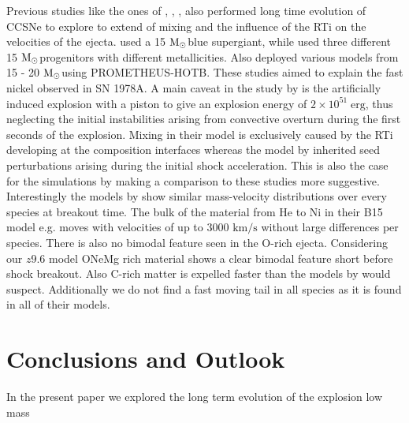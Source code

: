 \documentclass[fleqn,usenatbib]{mnras}
\newcommand{\solm}{\xspace\ensuremath{\rm{M_{\odot}}}}
\newcommand{\kms}{$\mathrm{km/s}$\xspace}
\newcommand{\prom}{\textsc{P{\footnotesize ROMETHEUS}-H{\footnotesize OT}B}\xspace}
\begin{document}
Previous studies like the ones of \cite{Hammer2010}, \cite{Joggerst2010}, \citet{Wongwathanarat2015}, \citet{Kifonidis2005} also performed long time evolution of CCSNe to explore to extend of mixing and the influence of the RTi on the velocities of the ejecta. \cite{Hammer2010} used a 15 \solm blue supergiant, while \cite{Joggerst2010} used three different 15 \solm progenitors with different metallicities. Also \cite{Wongwathanarat2015} deployed various models from 15 - 20 \solm using \prom. These studies aimed to explain the fast nickel observed in SN 1978A.
A main caveat in the study by \cite{Joggerst2010} is the artificially induced explosion with a piston to give an explosion energy of $2\times 10^{51}\;\mathrm{erg}$, thus neglecting the initial instabilities arising from convective overturn during the first seconds of the explosion. Mixing in their model is exclusively caused by the RTi developing at the composition interfaces whereas the model by \cite{Hammer2010} inherited seed perturbations arising during the initial shock acceleration. This is also the case for the simulations by \cite{Wongwathanarat2015} making a comparison to these studies more suggestive.
Interestingly the models by \cite{Wongwathanarat2015} show similar mass-velocity distributions over every species at breakout time. The bulk of the material from He to Ni in their B15 model e.g. moves with velocities of up to 3000 \kms without large differences per species. There is also no bimodal feature seen in the O-rich ejecta. Considering our $z9.6$ model ONeMg rich material shows a clear bimodal feature short before shock breakout. Also C-rich matter is expelled faster than the models by \cite{Wongwathanarat2015} would suspect. Additionally we do not find a fast moving tail in all species as it is found in all of their models. 

\section{Conclusions and Outlook}
In the present paper we explored the long term evolution of the explosion  low mass 
\end{document}
